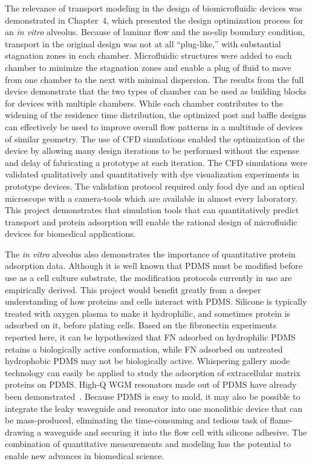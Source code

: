 The relevance of transport modeling in the design of biomicrofluidic
devices was demonstrated in Chapter~4, which presented the design
optimization process for an \emph{in vitro} alveolus. Because of laminar
flow and the no-slip boundary condition, transport in the original
design was not at all {}``plug-like,'' with substantial stagnation
zones in each chamber. Microfluidic structures were added to each
chamber to minimize the stagnation zones and enable a plug of fluid
to move from one chamber to the next with minimal dispersion. The
results from the full device demonstrate that the two types of chamber
can be used as building blocks for devices with multiple chambers.
While each chamber contributes to the widening of the residence time
distribution, the optimized post and baffle designs can effectively
be used to improve overall flow patterns in a multitude of devices
of similar geometry. The use of CFD simulations enabled the optimization
of the device by allowing many design iterations to be performed without
the expense and delay of fabricating a prototype at each iteration.
The CFD simulations were validated qualitatively and quantitatively
with dye visualization experiments in prototype devices. The validation
protocol required only food dye and an optical microscope with a camera\nobreakdash-tools
which are available in almost every laboratory. This project demonstrates
that simulation tools that can quantitatively predict transport and
protein adsorption will enable the rational design of microfluidic
devices for biomedical applications.

The \emph{in vitro} alveolus also demonstrates the importance of quantitative
protein adsorption data. Although it is well known that PDMS must
be modified before use as a cell culture substrate, the modification
protocols currently in use are empirically derived. This project would
benefit greatly from a deeper understanding of how proteins and cells
interact with PDMS. Silicone is typically treated with oxygen plasma
to make it hydrophilic, and sometimes protein is adsorbed on it, before
plating cells. Based on the fibronectin experiments reported here,
it can be hypothesized that FN adsorbed on hydrophilic PDMS retains
a biologically active conformation, while FN adsorbed on untreated
hydrophobic PDMS may not be biologically active. Whispering gallery
mode technology can easily be applied to study the adsorption of extracellular
matrix proteins on PDMS. High-Q WGM resonators made out of PDMS have
already been demonstrated~\cite{Martin2004}. Because PDMS is easy
to mold, it may also be possible to integrate the leaky waveguide
and resonator into one monolithic device that can be mass-produced,
eliminating the time-consuming and tedious task of flame-drawing a
waveguide and securing it into the flow cell with silicone adhesive.
The combination of quantitative measurements and modeling has the
potential to enable new advances in biomedical science.
